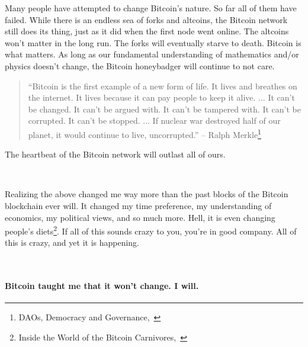 Many people have attempted to change Bitcoin's nature. So far all of
them have failed. While there is an endless sea of forks and altcoins,
the Bitcoin network still does its thing, just as it did when the first
node went online. The altcoins won't matter in the long run. The forks
will eventually starve to death. Bitcoin is what matters. As long as our
fundamental understanding of mathematics and/or physics doesn't change,
the Bitcoin honeybadger will continue to not care.

\begin{quotation}
``Bitcoin is the first example of a new form of life. It lives and
breathes on the internet. It lives because it can pay people to keep
it alive. ... It can't be changed. It can't be argued with. It
can't be tampered with. It can't be corrupted. It can't be stopped.
... If nuclear war destroyed half of our planet, it would continue
to live, uncorrupted.''
\flushright -- Ralph Merkle\footnote{DAOs, Democracy and Governance,~\cite{merkle-dao}}
\end{quotation}

The heartbeat of the Bitcoin network will outlast all of ours.

~

Realizing the above changed me way more than the past blocks of the Bitcoin
blockchain ever will. It changed my time preference, my understanding of
economics, my political views, and so much more. Hell, it is even changing
people's diets\footnote{Inside the World of the Bitcoin Carnivores,~\cite{carnivores}}. If all of this sounds crazy to you, you're in good company.
All of this is crazy, and yet it is happening.

~

\paragraph{Bitcoin taught me that it won't change. I will.}


